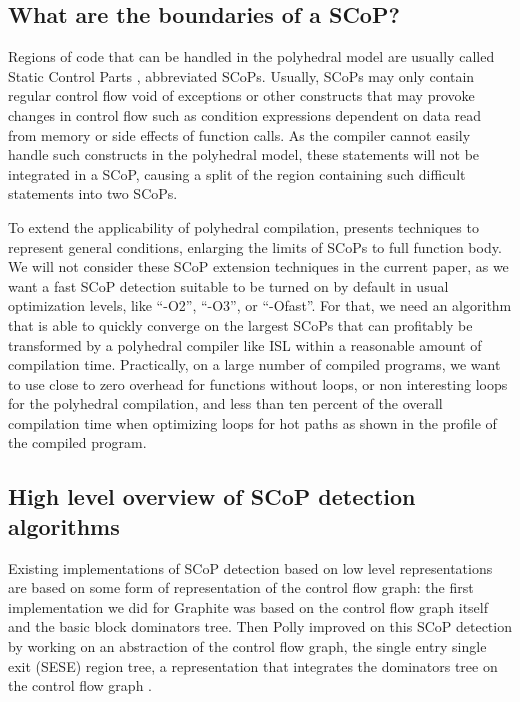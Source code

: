 \documentclass{sigplanconf}
\begin{document}
\subsection{What are the boundaries of a SCoP?}

Regions of code that can be handled in the polyhedral model are usually called
Static Control Parts \cite{Bondhugula}, abbreviated SCoPs.
Usually, SCoPs may only contain regular
control flow void of exceptions or other constructs that may provoke changes in
control flow such as condition expressions dependent on data read from memory or
side effects of function calls.  As the compiler cannot easily handle such
constructs in the polyhedral model, these statements will not be integrated in a
SCoP, causing a split of the region containing such difficult statements into
two SCoPs.

To extend the applicability of polyhedral compilation, \cite{scopExtend}
presents techniques to represent general conditions, enlarging the limits of
SCoPs to full function body.  We will not consider these SCoP extension
techniques in the current paper, as we want a fast SCoP detection suitable to be
turned on by default in usual optimization levels, like ``-O2'', ``-O3'', or
``-Ofast''.  For that, we need an algorithm that is able to quickly converge on
the largest SCoPs that can profitably be transformed by a polyhedral compiler
like ISL \cite{verdoolaege2010isl} within a reasonable amount of compilation time.
Practically, on a large number of compiled programs, we want to use close to
zero overhead for functions without loops, or non interesting loops for the
polyhedral compilation, and less than ten percent of the overall compilation
time when optimizing loops for hot paths as shown in the profile of the compiled
program.

\subsection{High level overview of SCoP detection algorithms}

Existing implementations of SCoP detection based on low level representations
are based on some form of representation of the control flow graph: the first
implementation we did for Graphite \cite{graphite} was based on the control
flow graph itself and the basic block dominators tree.  Then Polly improved on
this SCoP detection \cite{polly} by working on an abstraction of the control flow graph, the
single entry single exit (SESE) region tree, a representation that integrates
the dominators tree on the control flow graph \cite{sese}.
\end{document}
